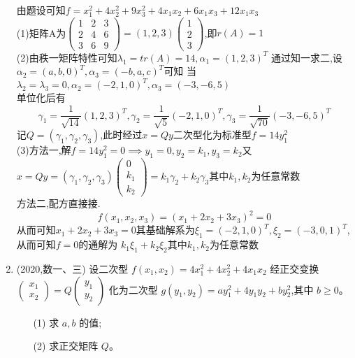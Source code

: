 \documentclass[12pt, a4paper, oneside, UTF8]{ctexbook}
\begin{document}
\begin{enumerate}[label=\arabic*.]
    \begin{solution}
    由题设可知$f=x_1^2+4x_2^2+9x_3^2+4x_1x_2+6x_1x_3+12x_1x_3$ \\
    (1)矩阵A为$\begin{pmatrix}
        1 & 2 & 3 \\
        2 & 4 & 6 \\
        3 & 6 & 9
    \end{pmatrix} = (1,2,3)\begin{pmatrix}
        1 \\
        2 \\
        3
    \end{pmatrix}$,即$r(A)=1$ \\
    (2)由秩一矩阵特性可知$\lambda_1=tr(A)=14,\alpha_1=(1,2,3)^T$ 通过知一求二,设$\alpha_2=(a,b,0)^T,\alpha_3=(-b,a,c)^T$可知
    当$\lambda_2=\lambda_3=0,\alpha_2=(-2,1,0)^T,\alpha_3=(-3,-6,5)$ \\
    单位化后有 
    $$
    \gamma_1=\frac{1}{\sqrt{14}}(1,2,3)^T,\gamma_2=\frac{1}{\sqrt{5}}(-2,1,0)^T,\gamma_3=\frac{1}{\sqrt{70}}(-3,-6,5)^T
    $$
    记$Q=(\gamma_1,\gamma_2,\gamma_3)$,此时经过$x=Qy$二次型化为标准型$f=14y_1^2$ \\
    (3)方法一,解$f=14y_1^2=0\implies y_1=0,y_2=k_1,y_3=k_2$又$x=Qy=(\gamma_1,\gamma_2,\gamma_3)\begin{pmatrix}
        0 \\
        k_1 \\
        k_2
    \end{pmatrix}=k_1\gamma_2+k_2\gamma_3$其中$k_1,k_2$为任意常数 \\
    方法二,配方直接接. 
    $$
    f(x_1,x_2,x_3)=(x_1+2x_2+3x_3)^2 = 0
    $$
    从而可知$x_1+2x_2+3x_3=0$其基础解系为$\xi_1=(-2,1,0)^T,\xi_2=(-3,0,1)^T$,从而可知$f=0$的通解为 
    $k_1\xi_1+k_2\xi_2$其中$k_1,k_2$为任意常数
    \end{solution}
    
    \item (2020,数一、三) 设二次型 $ f(x_1, x_2) = 4 x_1^2 + 4 x_2^2 + 4 x_1 x_2 $
    经正交变换 $ \begin{pmatrix} x_1 \\ x_2 \end{pmatrix} = Q \begin{pmatrix} y_1 \\ y_2 
    \end{pmatrix} $ 化为二次型 $ g(y_1, y_2) = ay_1^2 + 4y_1y_2 + b y_2^2 $,其中 $ b \geq 0 $。 
    \begin{enumerate}
        \item [(1)] 求 $ a, b $ 的值;
        \item [(2)] 求正交矩阵 $ Q $。
    \end{enumerate}
    

\end{enumerate}
\end{document}
